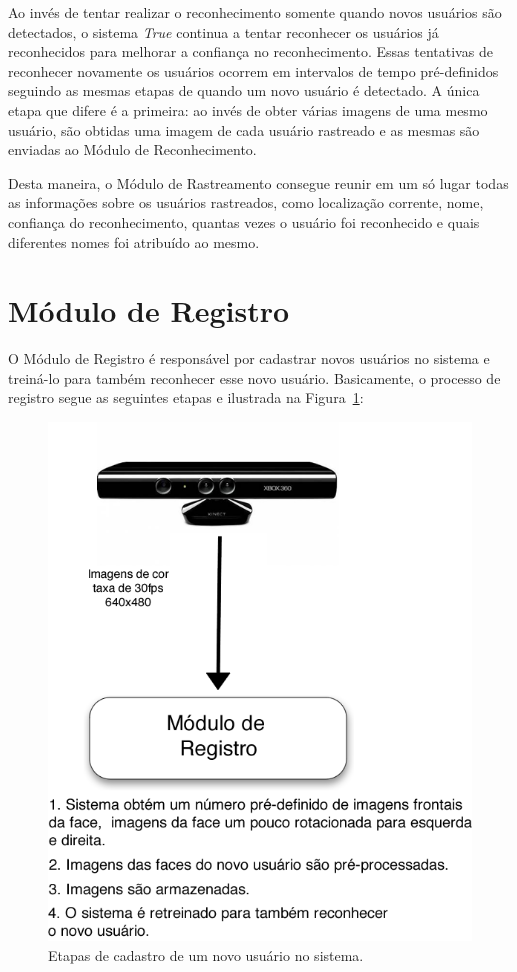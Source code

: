	Ao invés de tentar realizar o reconhecimento somente quando novos usuários são detectados, o sistema \textit{True} continua a tentar reconhecer os usuários já reconhecidos para melhorar a confiança no reconhecimento. Essas tentativas de reconhecer novamente os usuários ocorrem em intervalos de tempo pré-definidos seguindo as mesmas etapas de quando um novo usuário é detectado. A única etapa que difere é a primeira: ao invés de obter várias imagens de uma mesmo usuário, são obtidas uma imagem de cada usuário rastreado e as mesmas são enviadas ao Módulo de Reconhecimento.

	Desta maneira, o Módulo de Rastreamento consegue reunir em um só lugar todas as informações sobre os usuários rastreados, como localização corrente, nome, confiança do reconhecimento, quantas vezes o usuário foi reconhecido e quais diferentes nomes foi atribuído ao mesmo.


\section{Módulo de Registro}

	O Módulo de Registro é responsável por cadastrar novos usuários no sistema e treiná-lo para também reconhecer esse novo usuário. Basicamente, o processo de registro segue as seguintes etapas e ilustrada na Figura~\ref{fig:registro}:

		\begin{figure}[hbt]
			\begin{center}
				\includegraphics[scale=2.5]{figuras/4.ProblemaEProposta/registro.png}
			\end{center}
			\caption{Etapas de cadastro de um novo usuário no sistema.}
			\label{fig:registro}
		\end{figure}		

